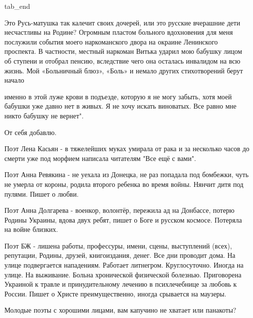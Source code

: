  tab_end
\fi

Это Русь-матушка так калечит своих дочерей, или это русские вчерашние дети
несчастливы на Родине? Огромным пластом больного вдохновения для меня послужили
события моего наркоманского двора на окраине Ленинского проспекта. В частности,
местный наркоман Витька ударил мою бабушку лицом об ступени и отобрал пенсию,
вследствие чего она осталась инвалидом на всю жизнь. Мой «Больничный блюз»,
«Боль» и немало других стихотворений берут начало

именно в этой луже крови в подъезде, которую я не могу забыть, хотя моей
бабушки уже давно нет в живых. Я не хочу искать виноватых. Все равно мне никто
бабушку не вернет".

От себя добавлю.

Поэт Лена Касьян - в тяжелейших муках умирала от рака и за несколько часов до
смерти уже под морфием написала читателям "Все ещё с вами".

Поэт Анна Ревякина - не уехала из Донецка, не раз попадала под бомбежки, чуть
не умерла от короны, родила второго ребенка во время войны. Нянчит дитя под
пулями. Пишет о любви.

Поэт Анна Долгарева - военкор, волонтёр, пережила ад на Донбассе, потерю Родины
Украины, вдова двух ребят, пишет о Боге и русском космосе. Потеряла на войне
близких.

Поэт БЖ - лишена работы, профессуры, имени, сцены, выступлений (всех),
репутации, Родины, друзей, книгоиздания, денег. Все дни проводит дома. На улице
подвергается нападениям. Работает литнегром. Круглосуточно. Иногда на улице. На
выживание. Больна хронической физической болезнью. Приговорена Украиной к
травле и принудительному лечению в психлечебнице за любовь к России. Пишет о
Христе преимущественно, иногда срывается на маузеры.

Молодые поэты с хорошими лицами, вам капучино не хватает или панакоты?
